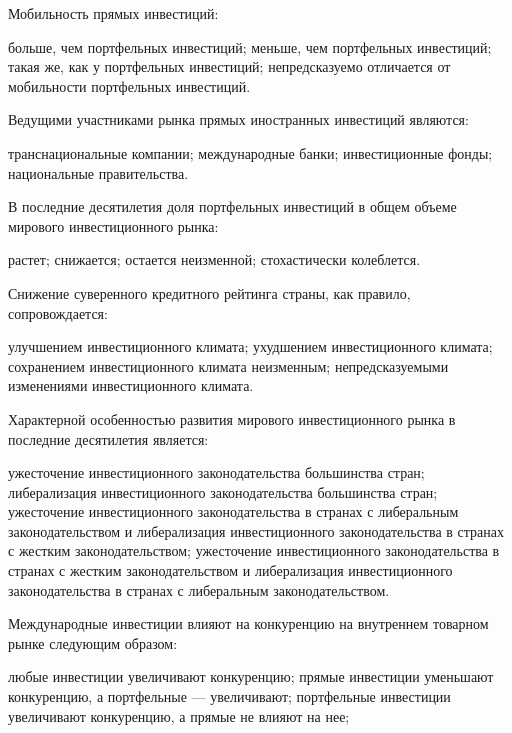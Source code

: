 \documentclass[12pt, table]{exam}
\begin{document}
\begin{questions}
\begin{multicols}{2}
\begin{choices}
	 \end{choices}
\question  Мобильность прямых инвестиций:
	 \begin{choices}
	 \CC больше, чем портфельных инвестиций;
	 \choice меньше, чем портфельных инвестиций;
	 \choice такая же, как у портфельных инвестиций;
	 \choice непредсказуемо отличается от мобильности портфельных инвестиций.
	 \end{choices}
\question  Ведущими участниками рынка прямых иностранных инвестиций являются:
	 \begin{choices}
	 \CC транснациональные компании;
	 \choice международные банки;
	 \choice инвестиционные фонды;
	 \choice национальные правительства.
	 \end{choices}
\question  В последние десятилетия доля портфельных инвестиций в общем объеме мирового инвестиционного рынка:
	 \begin{choices}
	 \CC растет;
	 \choice снижается;
	 \choice остается неизменной;
	 \choice стохастически колеблется.
	 \end{choices}
\question  Снижение суверенного кредитного рейтинга страны, как правило, сопровождается:
	 \begin{choices}
	 \CC улучшением инвестиционного климата;
	 \choice ухудшением инвестиционного климата;
	 \choice сохранением инвестиционного климата неизменным;
	 \choice непредсказуемыми изменениями инвестиционного климата.
	 \end{choices}
\question  Характерной особенностью развития мирового инвестиционного рынка в последние десятилетия является:
	 \begin{choices}
	 \CC ужесточение инвестиционного законодательства большинства стран;
	 \choice либерализация  инвестиционного законодательства большинства стран;
	 \choice ужесточение инвестиционного законодательства в странах с либеральным законодательством и либерализация инвестиционного законодательства в странах с жестким законодательством;
	 \choice ужесточение инвестиционного законодательства в странах с жестким законодательством и либерализация инвестиционного законодательства в странах с либеральным законодательством.
	 \end{choices}
\question  Международные инвестиции влияют на конкуренцию на внутреннем товарном рынке следующим образом:
	 \begin{choices}
	 \CC любые инвестиции увеличивают конкуренцию;
	 \choice прямые инвестиции уменьшают конкуренцию, а портфельные — увеличивают;
	 \choice портфельные инвестиции увеличивают конкуренцию, а прямые не влияют на нее;

\end{choices}
\end{multicols}
\end{questions}
\end{document}
